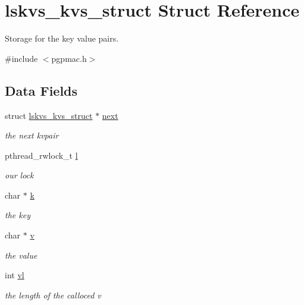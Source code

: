 \hypertarget{structlskvs__kvs__struct}{\section{lskvs\-\_\-kvs\-\_\-struct Struct Reference}
\label{structlskvs__kvs__struct}
}


Storage for the key value pairs.  




{\ttfamily \#include $<$pgpmac.\-h$>$}

\subsection*{Data Fields}
\begin{DoxyCompactItemize}
\item 
struct \hyperlink{structlskvs__kvs__struct}{lskvs\-\_\-kvs\-\_\-struct} $\ast$ \hyperlink{structlskvs__kvs__struct_a6302f184418962708bd1efe3320d4347}{next}
\begin{DoxyCompactList}\small\item\em the next kvpair \end{DoxyCompactList}\item 
pthread\-\_\-rwlock\-\_\-t \hyperlink{structlskvs__kvs__struct_a45129c7f3d0bb2efc83b8a0d7ea2d814}{l}
\begin{DoxyCompactList}\small\item\em our lock \end{DoxyCompactList}\item 
char $\ast$ \hyperlink{structlskvs__kvs__struct_afaaab7729ce9dbabd8f3e2c502a8e4c5}{k}
\begin{DoxyCompactList}\small\item\em the key \end{DoxyCompactList}\item 
char $\ast$ \hyperlink{structlskvs__kvs__struct_a27a0ae4415b6d65c8a9f9fac11c130f9}{v}
\begin{DoxyCompactList}\small\item\em the value \end{DoxyCompactList}\item 
int \hyperlink{structlskvs__kvs__struct_aa1c980ae62cdf78d8b358b3a51deda6a}{vl}
\begin{DoxyCompactList}\small\item\em the length of the calloced v \end{DoxyCompactList}\end{DoxyCompactItemize}


